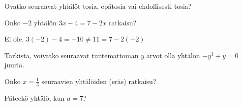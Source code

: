 \begin{tehtavasivu}


\begin{tehtava}
Ovatko seuraavat yhtälöt tosia, epätosia vai ehdollisesti tosia?

     \begin{vastaus}
    \end{vastaus}
\end{tehtava}

\begin{tehtava}
Onko $-2$ yhtälön $3x-4 = 7-2x$ ratkaisu?
\begin{vastaus}
Ei ole. $3(-2)-4 = -10 \ne 11=7-2(-2)$
\end{vastaus}
\end{tehtava}

\begin{tehtava}
Tarkista, voivatko seuraavat tuntemattoman $y$ arvot olla yhtälön $-y^3+y=0$ juuria.

  \begin{vastaus}
  \end{vastaus}
\end{tehtava}

\begin{tehtava}
Onko $x=\frac{1}{3}$ seuraavien yhtälöiden (eräs) ratkaisu?

  \begin{vastaus}
  \end{vastaus}
\end{tehtava}

\begin{tehtava}
Päteekö yhtälö, kun $a=7$?
    \begin{vastaus}
    \end{vastaus}
\end{tehtava}


\end{tehtavasivu}
